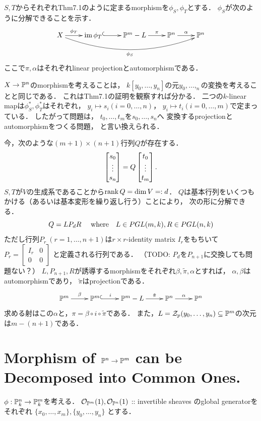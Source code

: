 \documentclass[a4paper]{jsarticle}
\begin{document}
    $S,T$からそれぞれThm7.1のように定まるmorphismを$\phi_S, \phi_T$とする．
    $\phi_S$が次のように分解できることを示す．
    \[
        \xymatrix
        {
            X \ar@/_20pt/[rrrr]_-{\phi_S}\ar[r]^-{\phi_T}&
                \im \phi_T \ar@{^{(}->}[r]& \proj^m-L \ar[r]^-{\pi}&
                    \proj^n \ar[r]^-{\alpha}& \proj^n
        }
    \]
    ここで$\pi, \alpha$はそれぞれlinear projectionとautomorphismである．

    $X \to \mathbb{P}^n$のmorphismを考えることは，
    $k[y_0,\dots, y_n]$の元$y_0,\dots,_n$の変換を考えることと同じである．
    これはThm7.1の証明を観察すれば分かる．
    二つの$k$-linear mapは$\phi_S^*, \phi_T^*$はそれぞれ，
    $y_i \mapsto s_i (i=0,\dots,n)$，
    $y_i \mapsto t_i (i=0,\dots,m)$で定まっている．
    したがって問題は，
    $t_0,\dots,t_m$を$s_0,\dots,s_n$へ
    変換するprojectionとautomorphismをつくる問題，
    と言い換えられる．

    今，次のような$(m+1) \times (n+1)$行列$Q$が存在する．
    \[
        \begin{bmatrix} s_0 \\ \vdots \\ s_n \end{bmatrix}
        =Q \begin{bmatrix} t_0 \\ \vdots \\ t_m \end{bmatrix}.
    \]
    $S,T$が$V$の生成系であることから$\operatorname{rank} Q=\dim V=:d$．
    $Q$は基本行列をいくつもかける（あるいは基本変形を繰り返し行う）ことにより，
    次の形に分解できる．
    \[
        Q=L P_{d} R~~
        ~~\text{where}~~~ L \in PGL(m,k), R \in PGL(n,k)
    \]
    ただし行列$P_r ~(r=1,\dots,n+1)$は$r \times r$-identity matrix $I_r$をもちいて
    $P_{r}=
    \begin{bmatrix}
        I_r & 0 \\
        0 & 0
    \end{bmatrix}$
    と定義される行列である．
    （TODO: $P_{d}$を$P_{n+1}$に交換しても問題ない？）
    $L, P_{n+1}, R$が誘導するmorphismをそれぞれ$\beta, \tilde{\pi} ,\alpha$とすれば，
    $\alpha, \beta$はautomorphismであり，
    $\tilde{\pi}$はprojectionである．
    \[
        \xymatrix
        {
            \proj^m \ar[r]^-{\beta}& \proj^m
            \ar@{^{(}->}[r]^-{i}& \proj^m-L
            \ar[r]^-{\tilde{\pi}}& \proj^n
            \ar[r]^-{\alpha}& \proj^n
        }
    \]
    求める射はこの$\alpha$と，$\pi=\beta \circ i \circ \tilde{\pi}$である．
    また，$L=\mathcal{Z}_p(y_0,\dots,y_n) \subseteq \mathbb{P}^m$の次元は$m-(n+1)$である．

\section{Morphism of $\mathbb{P}^n \to \mathbb{P}^m$ can be Decomposed into Common Ones.} %
    $\phi: \mathbb{P}^n_k \to \mathbb{P}^m_k$を考える．
    $\mathcal{O}_{\mathbb{P}^m}(1), \mathcal{O}_{\mathbb{P}^n}(1)$
     :: invertible sheaves
    のglobal generatorをそれぞれ
    $\{x_0,\dots,x_m\}, \{y_0,\dots,y_n\}$
    とする．
\end{document}
